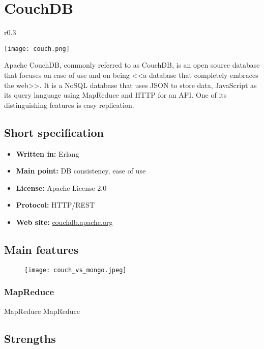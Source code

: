 \chapter{CouchDB}

\begin{wrapfigure}{r}{0.3\textwidth}
  \vspace{-42pt}
  \begin{center}
    \texttt{[image: couch.png]}
  \end{center}
  \vspace{-50pt}
\end{wrapfigure}
Apache CouchDB, commonly referred to as CouchDB, is an open source database that focuses on ease of use and on being <<a database that completely embraces the web>>. It is a NoSQL database that uses JSON to store data, JavaScript as its query language using MapReduce and HTTP for an API. One of its distinguishing features is easy replication.

\section{Short specification}

\begin{itemize}
  \item \textbf{Written in:} Erlang
  \item \textbf{Main point:} DB consistency, ease of use
  \item \textbf{License:} Apache License 2.0
  \item \textbf{Protocol:} HTTP/REST
  \item \textbf{Web site:} \href{http://couchdb.apache.org/}{couchdb.apache.org}
\end{itemize}

\section{Main features}

\begin{figure}[hb]
  \centering
  \texttt{[image: couch\_vs\_mongo.jpeg]}
\end{figure}

\subsection{MapReduce}

MapReduce MapReduce

\section{Strengths}


